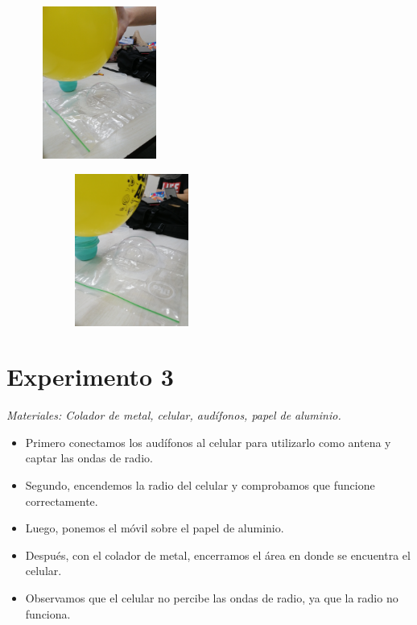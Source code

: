 \documentclass[a4paper,12pt]{article}
\begin{document}
\begin{figure}[h!]
    \begin{subfigure}
        \raggedright
        \includegraphics[width=4cm, height=5cm]{imag/Exp2_03.jpg}
    \end{subfigure}
    \begin{subfigure}
        \centering
        \includegraphics[width=4cm, height=5cm]{imag/Exp2_04.jpg}
    \end{subfigure}
\end{figure}
\newpage
\section*{Experimento 3}
\textit{Materiales: Colador de metal, celular, audífonos, papel de aluminio.}
    \begin{itemize}
        \item Primero conectamos los audífonos al celular para utilizarlo como antena y captar las ondas de radio.
        \item Segundo, encendemos la radio del celular y comprobamos que funcione correctamente.
        \item Luego, ponemos el móvil sobre el papel de aluminio.
        \item Después, con el colador de metal, encerramos el área en donde se encuentra el celular.
        \item Observamos que el celular no percibe las ondas de radio, ya que la radio no funciona.
    \end{itemize}
\end{document}
